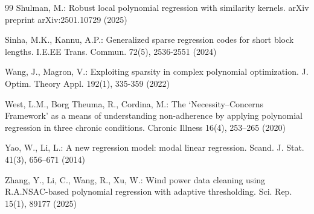 \documentclass[smallextended,referee,envcountsect,,numbers]{svjour3}
\begin{document}
\begin{thebibliography}{99}
	 Shulman, M.: Robust local polynomial regression with similarity kernels. arXiv preprint arXiv:2501.10729 (2025)
	
	 Sinha, M.K., Kannu, A.P.: Generalized sparse regression codes for short block lengths. I.E.EE Trans. Commun. 72(5), 2536-2551 (2024)
	
	 Wang, J., Magron, V.: Exploiting sparsity in complex polynomial optimization. J. Optim. Theory Appl. 192(1), 335-359 (2022)
	
	West, L.M., Borg Theuma, R., Cordina, M.:
	The ‘Necessity--Concerns Framework’ as a means of understanding non-adherence by applying polynomial regression in three chronic conditions.
	Chronic Illness 16(4), 253--265 (2020)
	
	 Yao, W., Li, L.: A new regression model: modal linear regression. Scand. J. Stat. 41(3), 656--671 (2014)
	
	 Zhang, Y., Li, C., Wang, R., Xu, W.: Wind power data cleaning using R.A.NSAC-based polynomial regression with adaptive thresholding. Sci. Rep. 15(1), 89177 (2025)
\end{thebibliography}
\end{document}
